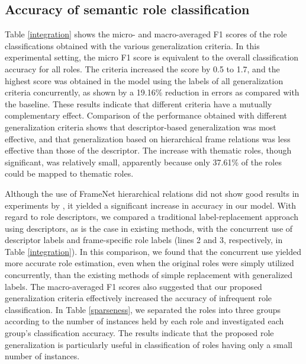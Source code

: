 \documentclass[english]{jnlp_1.4_rep}
\begin{document}
\subsection{Accuracy of semantic role classification}

Table \ref{integration} shows the micro- and macro-averaged F1 scores of the role classifications obtained with the various generalization criteria. In this experimental setting, the micro F1 score is equivalent to the overall classification accuracy for all roles. The criteria increased the score by 0.5 to 1.7, and the highest score was obtained in the model using the labels of all generalization criteria concurrently, as shown by a 19.16\% reduction in errors as compared with the baseline. These results indicate that different criteria have a mutually complementary effect. Comparison of the performance obtained with different generalization criteria shows that descriptor-based generalization was most effective, and that generalization based on hierarchical frame relations was less effective than those of the descriptor. The increase with thematic roles, though significant, was relatively small, apparently because only 37.61\% of the roles could be mapped to thematic roles.

Although the use of FrameNet hierarchical relations did not show good results in experiments by , it yielded a significant increase in accuracy in our model. With regard to role descriptors, we compared a traditional label-replacement approach using descriptors, as is the case in existing methods, with the concurrent use of descriptor labels and frame-specific role labels (lines 2 and 3, respectively, in Table \ref{integration}). In this comparison, we found that the concurrent use yielded more accurate role estimation, even when the original roles were simply utilized concurrently, than the existing methods of simple replacement with generalized labels.
The macro-averaged F1 scores also suggested that our proposed generalization criteria effectively increased the accuracy of infrequent role classification.
In Table \ref{sparseness}, we separated the roles into three groups according to the number of instances held by each role and investigated each group's classification accuracy. The results indicate that the proposed role generalization is particularly useful in classification of roles having only a small number of instances.

\begin{table}[b]
\begin{minipage}{212pt}
\setlength{\captionwidth}{212pt}
\label{integration}

\end{minipage}
\hfill
\begin{minipage}{198pt}
\setlength{\captionwidth}{198pt}
\label{sparseness}

\end{minipage}
\end{table}
\end{document}
